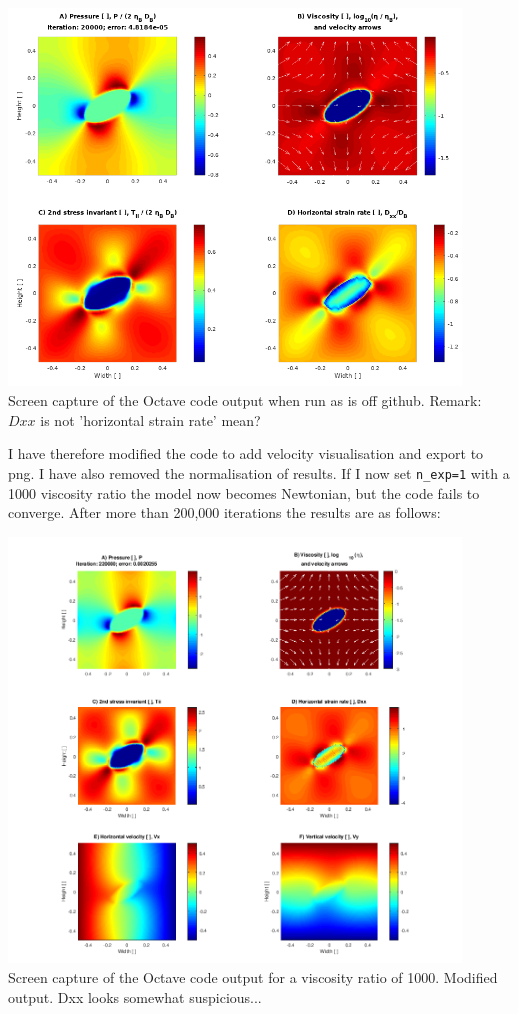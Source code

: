 \begin{center}
\includegraphics[width=12cm]{python_codes/fieldstone_142/images/octave1}\\
{\captionfont Screen capture of the Octave code output when run as is off github.
Remark: $Dxx$ is not 'horizontal strain rate' mean? }
\end{center}

I have therefore modified the code to add velocity visualisation and export to png.
I have also removed the normalisation of results.
If I now set \verb|n_exp=1| with a 1000 viscosity ratio the model now becomes Newtonian,
but the code fails to converge. After more than 200,000 iterations the results are as 
follows:

\begin{center}
\includegraphics[width=12cm]{python_codes/fieldstone_142/images/octave2}\\
{\captionfont Screen capture of the Octave code output for a viscosity ratio of 1000.
Modified output. Dxx looks somewhat suspicious...}
\end{center}

